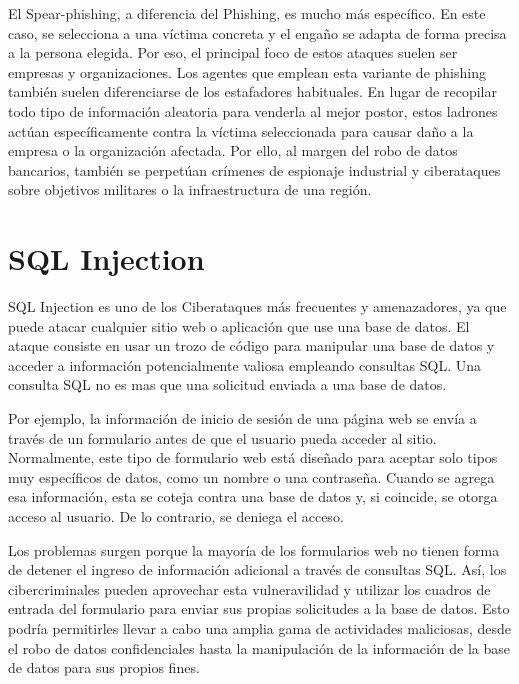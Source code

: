 El Spear-phishing, a diferencia del Phishing, es mucho más específico. En este caso, se selecciona a una víctima concreta y el engaño se adapta de forma precisa a la 
persona elegida. Por eso, el principal foco de estos ataques suelen ser empresas y organizaciones. Los agentes que emplean esta variante de phishing 
también suelen diferenciarse de los estafadores habituales. En lugar de recopilar todo tipo de información aleatoria para venderla al mejor postor, estos
ladrones actúan específicamente contra la víctima seleccionada para causar daño a la empresa o la organización afectada. Por ello, al margen del robo de 
datos bancarios, también se perpetúan crímenes de espionaje industrial y ciberataques sobre objetivos militares o la infraestructura de una región.

\section{SQL Injection}
\label{sec:sql-injection}

SQL Injection es uno de los Ciberataques más frecuentes y amenazadores, ya que puede atacar cualquier sitio web o aplicación que use una base de datos. 
El ataque consiste en usar un trozo de código para manipular una base de datos y acceder a información potencialmente valiosa empleando consultas SQL. 
Una consulta SQL no es mas que una solicitud enviada a una base de datos. 

Por ejemplo, la información de inicio de sesión de una página web se envía a través de un formulario antes de que el usuario pueda acceder al sitio. Normalmente, 
este tipo de formulario web está diseñado para aceptar solo tipos muy específicos de datos, como un nombre o una contraseña. Cuando se agrega esa información, 
esta se coteja contra una base de datos y, si coincide, se otorga acceso al usuario. De lo contrario, se deniega el acceso.

Los problemas surgen porque la mayoría de los formularios web no tienen forma de detener el ingreso de información adicional a través de consultas SQL. Así, los 
cibercriminales pueden aprovechar esta vulneravilidad y utilizar los cuadros de entrada del formulario para enviar sus propias solicitudes a la base de datos. Esto 
podría permitirles llevar a cabo una amplia gama de actividades maliciosas, desde el robo de datos confidenciales hasta la manipulación de la información de la base 
de datos para sus propios fines. \nocite{sqli-kaspersky}


